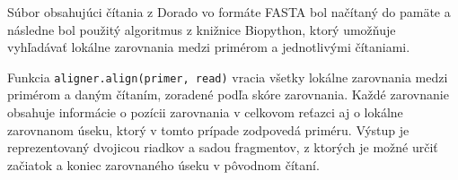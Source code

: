Súbor obsahujúci čítania z Dorado vo formáte FASTA bol načítaný do pamäte a následne bol použitý algoritmus z knižnice Biopython, ktorý umožňuje vyhľadávať lokálne zarovnania medzi primérom a jednotlivými čítaniami.

Funkcia \texttt{aligner.align(primer, read)} vracia všetky lokálne zarovnania medzi primérom a daným čítaním, zoradené podľa skóre zarovnania.
Každé zarovnanie obsahuje informácie o pozícii zarovnania v celkovom reťazci aj o lokálne zarovnanom úseku, ktorý v tomto prípade zodpovedá priméru.
Výstup je reprezentovaný dvojicou riadkov a sadou fragmentov, z ktorých je možné určiť začiatok a koniec zarovnaného úseku v pôvodnom čítaní.
